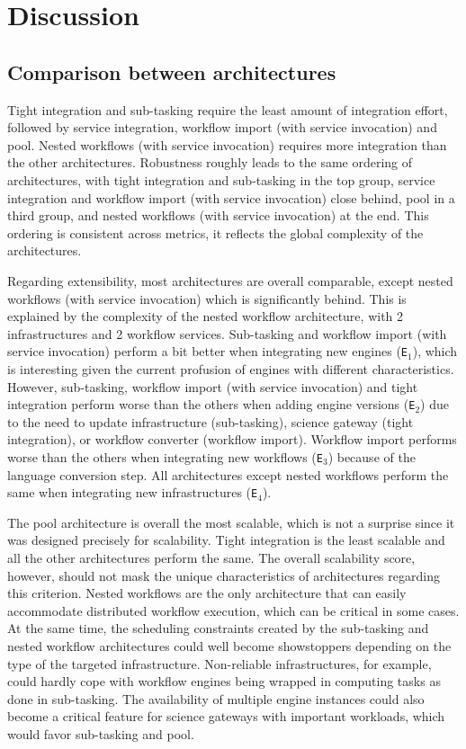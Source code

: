 \documentclass[preprint,3p,twocolumn]{elsarticle}
\begin{document}
\section{Discussion}

\subsection{Comparison between architectures}

Tight integration and sub-tasking require the least amount of
integration effort, followed by service integration, workflow import
(with service invocation) and pool. Nested workflows (with service
invocation) requires more integration than the other
architectures. Robustness roughly leads to the same ordering of
architectures, with tight integration and sub-tasking in the top
group, service integration and workflow import (with service
invocation) close behind, pool in a third group, and nested workflows
(with service invocation) at the end. This ordering is consistent
across metrics, it reflects the global complexity of the
architectures.

Regarding extensibility, most architectures are overall comparable,
except nested workflows (with service invocation) which is
significantly behind. This is explained by the complexity of the
nested workflow architecture, with 2 infrastructures and 2 workflow
services. Sub-tasking and workflow import (with service invocation)
perform a bit better when integrating new engines (\texttt{E$_1$}), which
is interesting given the current profusion of engines with different
characteristics.  However, sub-tasking, workflow import (with service
invocation) and tight integration perform worse than the others when adding
engine versions (\texttt{E$_2$}) due to the need to update
infrastructure (sub-tasking), science gateway (tight integration), or
workflow converter (workflow import). Workflow import performs worse
than the others when integrating new workflows (\texttt{E$_3$}) because of
the language conversion step. All architectures except nested
workflows perform the same when integrating new infrastructures (\texttt{E$_4$}).

The pool architecture is overall the most scalable, which is not a
surprise since it was designed precisely for scalability. Tight
integration is the least scalable and all the other architectures
perform the same. The overall scalability score, however, should not
mask the unique characteristics of architectures regarding this
criterion. Nested workflows are the only architecture that can easily
accommodate distributed workflow execution, which can be critical in
some cases. At the same time, the scheduling constraints created by
the sub-tasking and nested workflow architectures could well become
showstoppers depending on the type of the targeted
infrastructure. Non-reliable infrastructures, for example, could
hardly cope with workflow engines being wrapped in computing tasks as
done in sub-tasking. The availability of multiple engine instances
could also become a critical feature for science gateways with
important workloads, which would favor sub-tasking and pool.
\end{document}
